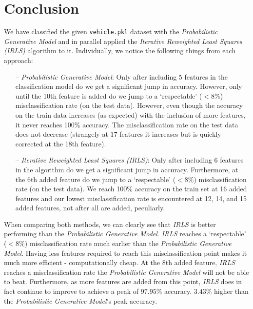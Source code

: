 \documentclass[a4paper,11pt,oneside]{article}
\begin{document}
\newpage
\section{Conclusion}
We have classified the given \texttt{vehicle.pkl} dataset with the \textit{Probabilistic Generative Model} and in parallel applied the \textit{Iterative Reweighted Least Squares (IRLS)} algorithm to it. Individually, we notice the following things from each approach:
\begin{itemize}
	\item[--] \textit{Probabilistic Generative Model}: Only after including 5 features in the classification model do we get a significant jump in accuracy. However, only until the 10th feature is added do we jump to a `respectable' ($<8\%$) misclassification rate (on the test data). However, even though the accuracy on the train data increases (as expected) with the inclusion of more features, it never reaches 100\% accuracy. The misclassification rate on the test data does not decrease (strangely at 17 features it increases but is quickly corrected at the 18th feature).
	\item[--] \textit{Iterative Reweighted Least Squares (IRLS)}: Only after including 6 features in the algorithm do we get a significant jump in accuracy. Furthermore, at the 6th added feature do we jump to a `respectable' ($<8\%$) misclassification rate (on the test data). We reach 100\% accuracy on the train set at 16 added features and our lowest misclassification rate is encountered at 12, 14, and 15 added features, not after all are added, peculiarly.
\end{itemize}

When comparing both methods, we can clearly see that \textit{IRLS} is better performing than the \textit{Probabilistic Generative Model}. \textit{IRLS} reaches a `respectable' ($<8\%$) misclassification rate much earlier than the \textit{Probabilistic Generative Model}. Having less features required to reach this misclassification point makes it much more efficient - computationally cheap. At the 8th added feature, \textit{IRLS} reaches a misclassification rate the \textit{Probabilistic Generative Model} will not be able to beat. Furthermore, as more features are added from this point, \textit{IRLS} does in fact continue to improve to achieve a peak of $97.95\%$ accuracy. $3.43\%$ higher than the \textit{Probabilistic Generative Model}'s peak accuracy.
\end{document}
